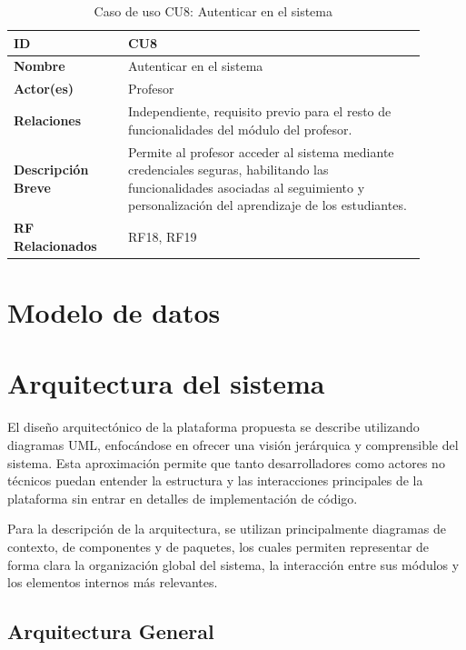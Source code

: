 \begin{table}[H]
\centering
\begin{tabular}{|p{0.25\linewidth}|p{0.65\linewidth}|}
\hline
\textbf{ID} & CU8 \\
\hline
\textbf{Nombre} & Autenticar en el sistema \\
\hline
\textbf{Actor(es)} & Profesor \\
\hline
\textbf{Relaciones} & Independiente, requisito previo para el resto de funcionalidades del módulo del profesor. \\
\hline
\textbf{Descripción Breve} & Permite al profesor acceder al sistema mediante credenciales seguras, habilitando las funcionalidades asociadas al seguimiento y personalización del aprendizaje de los estudiantes. \\
\hline
\textbf{RF Relacionados} & RF18, RF19 \\
\hline
\end{tabular}
\caption{Caso de uso CU8: Autenticar en el sistema}
\end{table}

\section{Modelo de datos}


\section{Arquitectura del sistema}

El diseño arquitectónico de la plataforma propuesta se describe utilizando diagramas UML, enfocándose en ofrecer una visión jerárquica y comprensible del sistema. Esta aproximación permite que tanto desarrolladores como actores no técnicos puedan entender la estructura y las interacciones principales de la plataforma sin entrar en detalles de implementación de código.

Para la descripción de la arquitectura, se utilizan principalmente diagramas de contexto, de componentes y de paquetes, los cuales permiten representar de forma clara la organización global del sistema, la interacción entre sus módulos y los elementos internos más relevantes.



\subsection{Arquitectura General}

